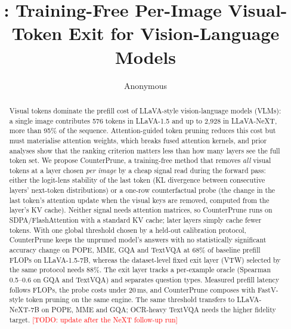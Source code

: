 \documentclass[10pt]{article}
\title{\method: Training-Free Per-Image Visual-Token Exit for Vision-Language Models}
\author{Anonymous}
\date{}
\newcommand{\method}{CounterPrune}
\newcommand{\todo}[1]{\textcolor{red}{[TODO: #1]}}
\begin{document}
\maketitle

\begin{abstract}
Visual tokens dominate the prefill cost of LLaVA-style vision-language models (VLMs): a single image contributes 576
tokens in LLaVA-1.5 and up to 2{,}928 in LLaVA-NeXT, more than 95\% of the sequence. Attention-guided token pruning
reduces this cost but must materialise attention weights, which breaks fused attention kernels, and prior analyses show
that the ranking criterion matters less than how many layers see the full token set. We propose \method, a
training-free method that removes \emph{all} visual tokens at a layer chosen \emph{per image} by a cheap signal read
during the forward pass: either the logit-lens stability of the last token (KL divergence between consecutive layers'
next-token distributions) or a one-row counterfactual probe (the change in the last token's attention update when the
visual keys are removed, computed from the layer's KV cache). Neither signal needs attention matrices, so \method{}
runs on SDPA/FlashAttention with a standard KV cache; later layers simply cache fewer tokens. With one global threshold
chosen by a held-out calibration protocol, \method{} keeps the unpruned model's answers with no statistically
significant accuracy change on POPE, MME, GQA and TextVQA at 68\% of baseline prefill FLOPs on LLaVA-1.5-7B, whereas
the dataset-level fixed exit layer (VTW) selected by the same protocol needs 88\%. The exit layer tracks a per-example
oracle (Spearman 0.5--0.6 on GQA and TextVQA) and separates question types. Measured prefill latency follows FLOPs, the
probe costs under 20\,ms, and \method{} composes with FastV-style token pruning on the same engine. The same threshold
transfers to LLaVA-NeXT-7B on POPE, MME and GQA; OCR-heavy TextVQA needs the higher fidelity target. \todo{update
after the NeXT follow-up run}
\end{abstract}
\end{document}
